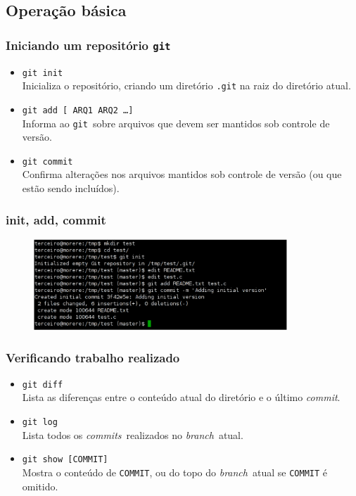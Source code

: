 \documentclass{beamer}
\newcommand{\git}{\texttt{git}}
\newcommand{\branch}{\emph{branch}}
\newcommand{\commit}{\emph{commit}}
\newcommand{\commits}{\emph{commits}}
\begin{document}
\subsection{Operação básica}

\begin{frame}
  \frametitle{Iniciando um repositório \git}
  \begin{itemize}
    \item \texttt{git init}\\
      Inicializa o repositório, criando um diretório \texttt{.git} na
      raiz do diretório atual.
      \pause

    \item \texttt{git add [ ARQ1 ARQ2 \ldots ]}\\
      Informa ao \git\ sobre arquivos que devem ser mantidos sob controle
      de versão.
      \pause

    \item \texttt{git commit}\\
      Confirma alterações nos arquivos mantidos sob controle de versão
      (ou que estão sendo incluídos).
  \end{itemize}
\end{frame}

\begin{frame}
  \frametitle{init, add, commit}
  \begin{figure}[h]
    \begin{center}
      \includegraphics[width=0.85\textwidth]{figs/git-screenshot-init-add-commit.pdf}
    \end{center}
    \label{fig:git-init-add-commit}
  \end{figure}
\end{frame}

\begin{frame}
  \frametitle{Verificando trabalho realizado}
  \begin{itemize}

    \item \texttt{git diff}\\
      Lista as diferenças entre o conteúdo atual do diretório e o último
      \commit.
      \pause

    \item \texttt{git log}\\
      Lista todos os \commits\ realizados no \branch\ atual.
      \pause

    \item \texttt{git show [COMMIT]}\\
      Mostra o conteúdo de \texttt{COMMIT}, ou do topo do \branch\ atual
      se \texttt{COMMIT} é omitido.

  \end{itemize}
\end{frame}
\end{document}
